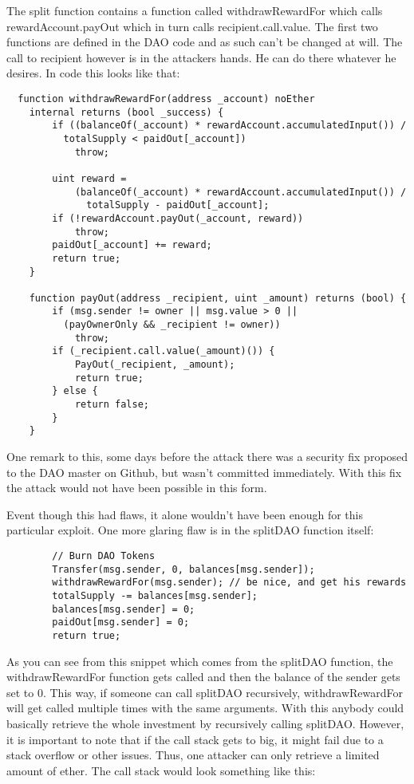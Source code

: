 \documentclass[a4paper, 11pt]{scrartcl}
\begin{document}
The split function contains a function called withdrawRewardFor which calls rewardAccount.payOut which in turn calls \textunderscore recipient.call.value. The first two functions are defined in the DAO code and as such can't be changed at will. The call to recipient however is in the attackers hands. He can do there whatever he desires. In code this looks like that: \cite{deconstructingDaoAttack}

\begin{verbatim}
  function withdrawRewardFor(address _account) noEther 
    internal returns (bool _success) {
        if ((balanceOf(_account) * rewardAccount.accumulatedInput()) /
          totalSupply < paidOut[_account])
            throw;

        uint reward =
            (balanceOf(_account) * rewardAccount.accumulatedInput()) /
              totalSupply - paidOut[_account];
        if (!rewardAccount.payOut(_account, reward))
            throw;
        paidOut[_account] += reward;
        return true;
    }

    function payOut(address _recipient, uint _amount) returns (bool) {
        if (msg.sender != owner || msg.value > 0 ||
          (payOwnerOnly && _recipient != owner))
            throw;
        if (_recipient.call.value(_amount)()) {
            PayOut(_recipient, _amount);
            return true;
        } else {
            return false;
        }
    }
\end{verbatim}

One remark to this, some days before the attack there was a security fix proposed to the DAO master on Github, but wasn't committed immediately. With this fix the attack would not have been possible in this form. \cite{securityFixPayout}

Event though this had flaws, it alone wouldn't have been enough for this particular exploit. One more glaring flaw is in the splitDAO function itself: \cite{deconstructingDaoAttack}

\begin{verbatim}
        // Burn DAO Tokens
        Transfer(msg.sender, 0, balances[msg.sender]);
        withdrawRewardFor(msg.sender); // be nice, and get his rewards
        totalSupply -= balances[msg.sender];
        balances[msg.sender] = 0;
        paidOut[msg.sender] = 0;
        return true;
\end{verbatim}

As you can see from this snippet which comes from the splitDAO function, the withdrawRewardFor function gets called and then the balance of the sender gets set to 0. This way, if someone can call splitDAO recursively, withdrawRewardFor will get called multiple times with the same arguments. With this anybody could basically retrieve the whole investment by recursively calling splitDAO. However, it is important to note that if the call stack gets to big, it might fail due to a stack overflow or other issues. Thus, one attacker can only retrieve a limited amount of ether. The call stack would look something like this: \cite{deconstructingDaoAttack}
\end{document}
